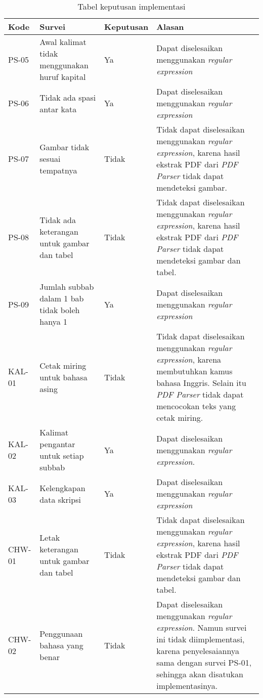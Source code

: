 \begin{table}[H]
	\caption {Tabel keputusan implementasi} \label{tab:keputusan}
	\begin{center}
		\begin{tabular}{|p{1.5 cm}|>{\raggedright} p{4 cm}| p{2 cm}| p{7 cm}|}
		\hline
		Kode & Survei & Keputusan & Alasan \\ 
		\hline 
		PS-05 & Awal kalimat tidak menggunakan huruf kapital & Ya & Dapat diselesaikan menggunakan \textit{regular expression} \newline \\ 
		\hline
		PS-06 & Tidak ada spasi antar kata & Ya & Dapat diselesaikan menggunakan \textit{regular expression} \newline \\ 
		\hline 
		PS-07 & Gambar tidak sesuai tempatnya & Tidak & Tidak dapat diselesaikan menggunakan \textit{regular expression}, karena hasil ekstrak PDF dari \textit{PDF Parser} tidak dapat mendeteksi gambar. \newline \\ 
		\hline 
		PS-08 & Tidak ada keterangan untuk gambar dan tabel & Tidak & Tidak dapat diselesaikan menggunakan \textit{regular expression}, karena hasil ekstrak PDF dari \textit{PDF Parser} tidak dapat mendeteksi gambar dan tabel. \newline \\ 
		\hline 
		PS-09 & Jumlah subbab dalam 1 bab tidak boleh hanya 1 & Ya & Dapat diselesaikan menggunakan \textit{regular expression} \newline \\ 
		\hline 
		KAL-01 & Cetak miring untuk bahasa asing & Tidak & Tidak dapat diselesaikan menggunakan \textit{regular expression}, karena membutuhkan kamus bahasa Inggris. Selain itu \textit{PDF Parser} tidak dapat mencocokan teks yang cetak miring. \newline \\ 
		\hline 
		KAL-02 & Kalimat pengantar untuk setiap subbab & Ya & Dapat diselesaikan menggunakan \textit{regular expression}. \newline \\ 
		\hline 
		KAL-03 & Kelengkapan data skripsi & Ya & Dapat diselesaikan menggunakan \textit{regular expression} \newline \\ 
		\hline 
		CHW-01 & Letak keterangan untuk gambar dan tabel & Tidak & Tidak dapat diselesaikan menggunakan \textit{regular expression}, karena hasil ekstrak PDF dari \textit{PDF Parser} tidak dapat mendeteksi gambar dan tabel.\newline \\ 
		\hline 
		CHW-02 & Penggunaan bahasa yang benar & Tidak & Dapat diselesaikan menggunakan \textit{regular expression}. Namun survei ini tidak diimplementasi, karena penyelesaiannya sama dengan survei PS-01, sehingga akan disatukan implementasinya. \newline \\
		\hline  
		\end{tabular}
	\end{center}
\end{table}

